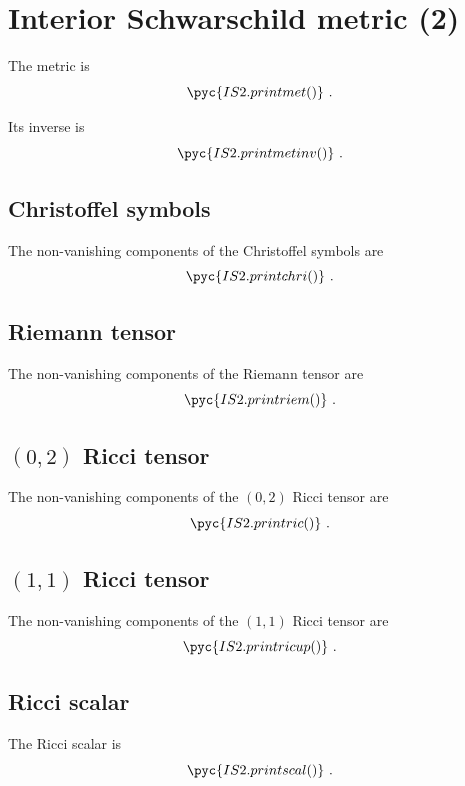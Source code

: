 \documentclass[a4paper, 12pt]{memoir}
\begin{document}
\chapter{Interior Schwarschild metric (2)}

    The metric is 
    \begin{equation*}
        \pyc{IS2.printmet()} ~.
    \end{equation*}

    Its inverse is 
    \begin{equation*}
        \pyc{IS2.printmetinv()} ~.
    \end{equation*}

\section{Christoffel symbols}
    The non-vanishing components of the Christoffel symbols are
    \begin{equation*}
        \pyc{IS2.printchri()} ~.
    \end{equation*}

\section{Riemann tensor}
    The non-vanishing components of the Riemann tensor are
    \begin{equation*}
        \pyc{IS2.printriem()} ~.
    \end{equation*}

\section{$(0,2)$ Ricci tensor}
    The non-vanishing components of the $(0,2)$ Ricci tensor are
    \begin{equation*}
        \pyc{IS2.printric()} ~.
    \end{equation*}

\section{$(1,1)$ Ricci tensor}
    The non-vanishing components of the $(1,1)$ Ricci tensor are
    \begin{equation*}
        \pyc{IS2.printricup()} ~.
    \end{equation*}

\section{Ricci scalar}
    The Ricci scalar is
    \begin{equation*}
        \pyc{IS2.printscal()} ~.
    \end{equation*}
\end{document}
